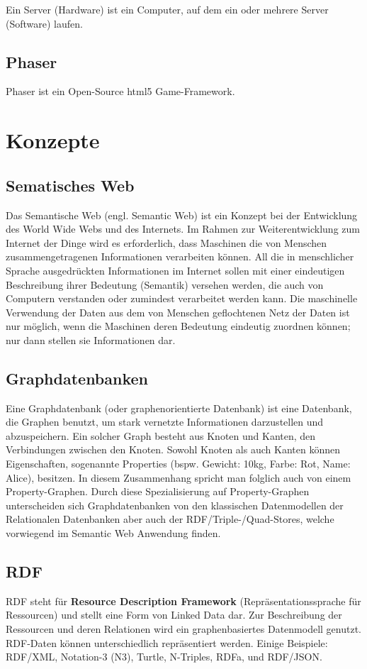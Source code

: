 \documentclass[11pt,a4paper]{article}
\begin{document}
Ein Server (Hardware) ist ein Computer, auf dem ein oder mehrere Server (Software) laufen.

\subsection{Phaser}
Phaser ist ein Open-Source html5 Game-Framework.
\section{Konzepte}
\subsection{Sematisches Web}
Das Semantische Web (engl. Semantic Web) ist ein Konzept bei der Entwicklung des World Wide Webs und des   Internets. Im Rahmen zur Weiterentwicklung zum Internet der Dinge wird es erforderlich, dass Maschinen die von   Menschen  zusammengetragenen Informationen verarbeiten können. All die   in  menschlicher Sprache ausgedrückten Informationen im Internet sollen   mit  einer eindeutigen Beschreibung ihrer Bedeutung (Semantik)   versehen  werden, die auch von Computern verstanden oder zumindest   verarbeitet  werden kann. Die maschinelle Verwendung der Daten aus dem   von Menschen  geflochtenen Netz der Daten ist nur möglich, wenn die   Maschinen deren  Bedeutung eindeutig zuordnen können; nur dann stellen   sie Informationen  dar.

\subsection{Graphdatenbanken}
Eine Graphdatenbank (oder graphenorientierte Datenbank) ist eine Datenbank, die Graphen benutzt, um stark vernetzte Informationen darzustellen und abzuspeichern. Ein solcher Graph besteht aus Knoten und Kanten, den Verbindungen zwischen den Knoten. Sowohl Knoten als auch Kanten können Eigenschaften, sogenannte Properties (bspw. Gewicht: 10kg, Farbe: Rot, Name: Alice), besitzen. In diesem Zusammenhang spricht man folglich auch von einem Property-Graphen. Durch diese Spezialisierung auf Property-Graphen unterscheiden sich Graphdatenbanken von den klassischen Datenmodellen der Relationalen Datenbanken aber auch der RDF/Triple-/Quad-Stores, welche vorwiegend im Semantic Web Anwendung finden.
\subsection{RDF}
RDF steht für \textbf{Resource Description Framework} (Repräsentationssprache für Ressourcen) und stellt eine
Form von Linked Data dar. Zur Beschreibung der Ressourcen und deren Relationen wird ein 
graphenbasiertes Datenmodell genutzt. RDF-Daten können unterschiedlich repräsentiert werden.
Einige Beispiele: RDF/XML, Notation-3 (N3), Turtle, N-Triples, RDFa, und RDF/JSON.
\end{document}
